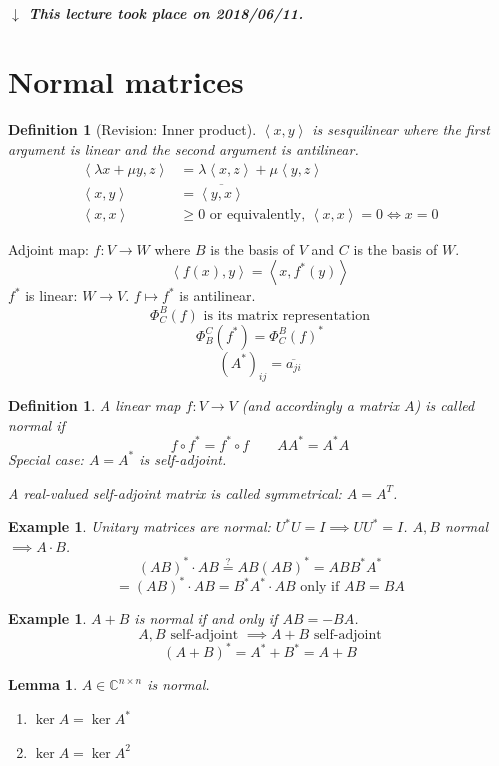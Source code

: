 \documentclass[a4paper]{article}
\newcounter{lecref}[section]
\numberwithin{lecref}{section}
\newtheorem{example}[lecref]{Example}
\newtheorem*{Example}{Example}
\newtheorem{definition}[lecref]{Definition}
\newtheorem{lemma}[lecref]{Lemma}
\newcommand{\angel}[1]{\left\langle#1\right\rangle}
\newcommand{\dateref}[1]{%
  \begin{mdframed}[backgroundcolor=gray!10,innerbottommargin=0pt,innertopmargin=0pt]
    \paragraph{\textit{$\downarrow$ This lecture took place on #1.}}%
  \end{mdframed}%
}
\begin{document}
\dateref{2018/06/11}

\section{Normal matrices} %

\begin{definition}[Revision: Inner product] %
  $\angel{x,y}$ is sesquilinear where the first argument is linear and the second argument is antilinear.
  \begin{align*}
    \angel{\lambda x + \mu y, z} &= \lambda \angel{x,z} + \mu \angel{y, z} \\
    \angel{x,y} &= \overline{\angel{y, x}} \\
    \angel{x,x} &\geq 0 \text{ or equivalently, } \angel{x,x} = 0 \iff x = 0
  \end{align*}
\end{definition}

Adjoint map: $f: V \to W$ where $B$ is the basis of $V$ and $C$ is the basis of $W$.
\[ \angel{f(x),y} = \angel{x,f^*(y)} \]
$f^*$ is linear: $W \to V$. $f \mapsto f^*$ is antilinear.
\[ \Phi_C^B(f) \text{ is its matrix representation} \]
\[ \Phi_B^C(f^*) = \Phi_C^B(f)^* \]
\[ (A^*)_{ij} = \overline{a_{ji}} \]

\begin{definition} %
  A linear map $f: V \to V$ (and accordingly a matrix $A$) is called \emph{normal} if
  \[ f \circ f^* = f^* \circ f \qquad A A^* = A^* A \]
  Special case: $A = A^*$ is self-adjoint.

  A real-valued self-adjoint matrix is called \emph{symmetrical}: $A = A^T$.
\end{definition}

\begin{example} %
  Unitary matrices are normal: $U^* U = I \implies U U^* = I$.
  $A, B$ normal $\implies A \cdot B$.
  \[ (AB)^* \cdot AB \overset?= AB (AB)^* = ABB^*A^* \]
  \[ = (AB)^* \cdot AB = B^* A^* \cdot  AB \text{ only if } AB = BA \]
\end{example}

\begin{Example}
  $A + B$ is normal if and only if $AB = -BA$.
  \[ A,B \text{ self-adjoint } \implies A+B \text{ self-adjoint} \]
  \[ (A + B)^* = A^* + B^* = A + B \]
\end{Example}

\begin{lemma} %
  $A \in \mathbb C^{n \times n}$ is normal.
  \begin{enumerate}
    \item $\ker{A} = \ker{A^*}$
    \item $\ker{A} = \ker{A^2}$
  \end{enumerate}
\end{lemma}
\end{document}
